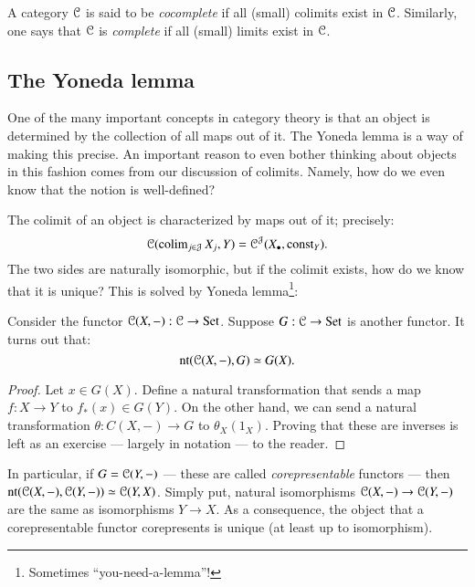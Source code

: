 \begin{definition}
    A category $\mathcal C$ is said to be \emph{cocomplete} if all (small) colimits exist in $\mathcal C$.
    Similarly, one says that $\mathcal C$ is \emph{complete} if all (small) limits exist in $\mathcal C$.
\end{definition}
\subsection{The Yoneda lemma}%
One of the many important concepts in category theory is that an object is determined by
the collection of all maps out of it.
The Yoneda lemma is a way of making this precise.
An important reason to even bother thinking about objects in this fashion comes from our
discussion of colimits.
Namely, how do we even know that the notion is well-defined?

The colimit of an object is characterized by maps out of it; precisely:
$$\mathcal C(\operatorname{colim}_{j\in\mathcal J}X_j,Y) = \mathcal C^\mathcal J(X_\bullet,\mathrm{const}_Y).$$
The two sides are naturally isomorphic, but if the colimit exists, how do we know that it
is unique?
This is solved by Yoneda lemma\footnote{Sometimes ``you-need-a-lemma''!}:
\begin{theorem}
    Consider the functor $\mathcal C(X,-):\mathcal C\to{\mathrm{Set}}$. Suppose $G:\mathcal C\to{\mathrm{Set}}$ is another functor. It turns out that:
    $$\mathrm{nt}(\mathcal C(X,-),G)\simeq G(X).$$
\end{theorem}
\begin{proof}
    Let $x\in G(X)$.
    Define a natural transformation that sends a map $f:X\to Y$ to $f_\ast(x)\in G(Y)$.
    On the other hand, we can send a natural transformation $\theta:C(X,-)\to G$
    to $\theta_X(1_X)$. 
    Proving that these are inverses is left as an exercise --- largely in notation --- to the reader.
\end{proof}
In particular, if $G=\mathcal C(Y,-)$
--- these are called \emph{corepresentable} functors ---
then $\mathrm{nt}(\mathcal C(X,-),\mathcal C(Y,-))\simeq \mathcal C(Y,X)$.
Simply put, natural isomorphisms $\mathcal C(X,-)\to \mathcal C(Y,-)$ are the same as isomorphisms $Y\to X$.
As a consequence, the object that a corepresentable functor corepresents is unique
(at least up to isomorphism).

